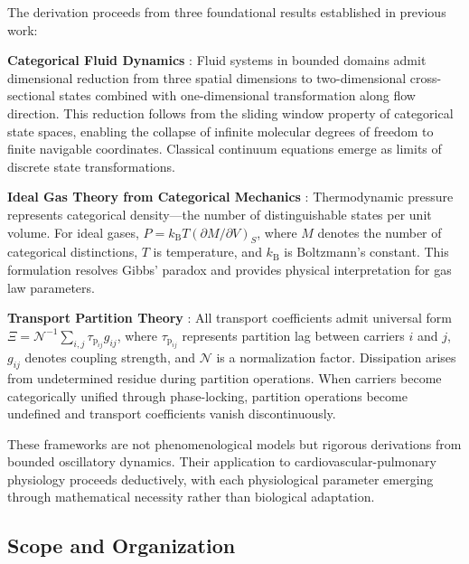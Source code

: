 \documentclass[10pt,twocolumn,a4paper]{article}
\theoremstyle{remark}
\newcommand{\kB}{k_{\mathrm{B}}}
\newcommand{\taulag}{\tau_{\mathrm{p}}}
\begin{document}
The derivation proceeds from three foundational results established in previous work:

\textbf{Categorical Fluid Dynamics} \cite{sachikonye2024fluid}: Fluid systems in bounded domains admit dimensional reduction from three spatial dimensions to two-dimensional cross-sectional states combined with one-dimensional transformation along flow direction. This reduction follows from the sliding window property of categorical state spaces, enabling the collapse of infinite molecular degrees of freedom to finite navigable coordinates. Classical continuum equations emerge as limits of discrete state transformations.

\textbf{Ideal Gas Theory from Categorical Mechanics} \cite{sachikonye2024gas}: Thermodynamic pressure represents categorical density—the number of distinguishable states per unit volume. For ideal gases, $P = \kB T (\partial M/\partial V)_{S}$, where $M$ denotes the number of categorical distinctions, $T$ is temperature, and $\kB$ is Boltzmann's constant. This formulation resolves Gibbs' paradox and provides physical interpretation for gas law parameters.

\textbf{Transport Partition Theory} \cite{sachikonye2024transport}: All transport coefficients admit universal form $\Xi = \mathcal{N}^{-1} \sum_{i,j} \taulag_{ij} g_{ij}$, where $\taulag_{ij}$ represents partition lag between carriers $i$ and $j$, $g_{ij}$ denotes coupling strength, and $\mathcal{N}$ is a normalization factor. Dissipation arises from undetermined residue during partition operations. When carriers become categorically unified through phase-locking, partition operations become undefined and transport coefficients vanish discontinuously.

These frameworks are not phenomenological models but rigorous derivations from bounded oscillatory dynamics. Their application to cardiovascular-pulmonary physiology proceeds deductively, with each physiological parameter emerging through mathematical necessity rather than biological adaptation.

\subsection{Scope and Organization}
\end{document}
